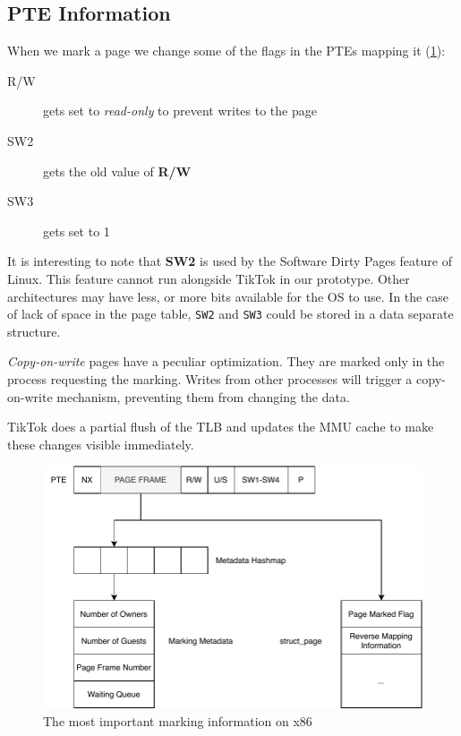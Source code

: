 \subsection{PTE Information}
\label{subsec:pageinfo}

When we mark a page we change some of the flags in the PTEs mapping it
(\cref{fig:bookkeeping}):

\begin{description}
  \item[R/W] gets set to \emph{read-only} to prevent writes to the page
  \item[SW2] gets the old value of \textbf{R/W}
  \item[SW3] gets set to 1 
\end{description}

It is interesting to note that \textbf{SW2} is used by the Software Dirty Pages
feature of Linux. This feature cannot run alongside TikTok in our prototype.
Other architectures may have less, or more bits available for the OS to use. In
the case of lack of space in the page table, \texttt{SW2} and \texttt{SW3} could
be stored in a data separate structure.

\emph{Copy-on-write} pages have a peculiar optimization. They are marked only in
the process requesting the marking. Writes from other processes will trigger a
copy-on-write mechanism, preventing them from changing the data.

TikTok does a partial flush of the TLB and updates the MMU cache to make these
changes visible immediately.

\begin{figure}[]
  \centering
  \includegraphics[width=\linewidth]{img/book-keeping.pdf}
  \caption{The most important marking information on x86}
  \label{fig:bookkeeping}
\end{figure}


